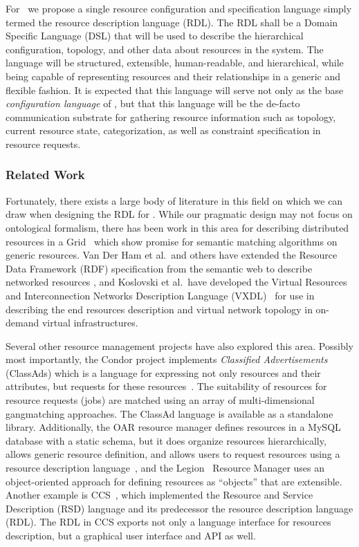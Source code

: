 For \ngrm\ we propose a single resource configuration and
specification language simply termed the resource description
language (RDL).  The RDL shall be a Domain
Specific Language (DSL) that will be used to describe the
hierarchical configuration, topology, and other data about
resources in the system. The language will be structured, extensible,
human-readable, and hierarchical, while being capable of
representing resources and their relationships in a generic and
flexible fashion. It is expected that this language will serve not
only as the base \emph{configuration language} of \ngrm, but that
this language will be the de-facto communication substrate for
gathering resource information such as topology, current resource
state, categorization, as well as constraint specification in
resource requests.

\subsubsection{Related Work}

Fortunately, there exists a large body of literature in this
field on which we can draw when designing the RDL for \ngrm.
While our pragmatic design may not focus on ontological formalism,
there has been work in this area for describing distributed resources
in a Grid~\cite{Castano:2004, Pernas:2005, Koning:2011:UOR:1998662.1998819}
which show promise for semantic matching algorithms on generic resources.
Van Der Ham et al.\ and others have extended the Resource Data Framework (RDF)
specification from the semantic web to describe networked resources
\cite{vanderHam:2006:URD:1160256.1160260, VanDerHam:2008:DTI:2285568.2285672, vanderHam:2006:SHN:1188455.1188643},
and Koslovski et al.\ have developed the Virtual Resources and
Interconnection Networks Description Language (VXDL)~\cite{Koslovski_Primet_2009} for use in
describing the end resources description and virtual network
topology in on-demand virtual infrastructures.

Several other resource management projects have also explored this
area. Possibly most importantly, the Condor project implements
\emph{Classified Advertisements} (ClassAds) which is a language
for expressing not only resources and their attributes, but
requests for these resources~\cite{ClassAd}. The suitability
of resources for resource requests (jobs) are matched using an
array of multi-dimensional gangmatching approaches. The ClassAd
language is available as a standalone library. Additionally, the
OAR resource manager defines resources in a MySQL database with
a static schema, but it does organize resources hierarchically,
allows generic resource definition, and allows users to request
resources using a resource description language~\cite{Oar}, and
the Legion~\cite{LegionGrid,LegionRM} Resource Manager uses an
object-oriented approach for defining resources as ``objects''
that are extensible. Another example is CCS~\cite{Keller98ccsresource},
which implemented the Resource and Service Description (RSD)
language and its predecessor the resource description language (RDL).
The RDL in CCS exports not only a language interface for resources
description, but a graphical user interface and API as well.

